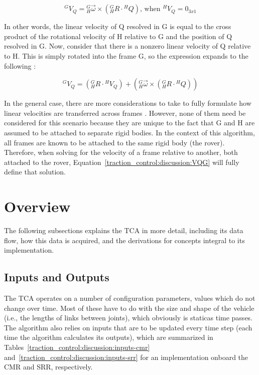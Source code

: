 \begin{equation}
	{}^{G}V_{Q} = {}^{G}_{H}\vec{\omega} \times \left({}^{G}_{H}R \cdot {}^{H}Q\right) \text{, when } {}^{H}V_{Q} = 0_{3x1}
\end{equation}

In other words, the linear velocity of Q resolved in G is equal to the cross product of the rotational velocity of H relative to G and the position of Q resolved in G. Now, consider that there is a nonzero linear velocity of Q relative to H. This is simply rotated into the frame G, so the expression expands to the following \cite{craig}:

\begin{equation}\label{traction_control:discussion:VQG}
	{}^{G}V_{Q} = \left({}^{G}_{H}R \cdot {}^{H}V_{Q}\right) + \left({}^{G}_{H}\vec{\omega} \times \left({}^{G}_{H}R \cdot {}^{H}Q\right)\right)
\end{equation}

In the general case, there are more considerations to take to fully formulate how linear velocities are transferred across frames \cite{craig}. However, none of them need be considered for this scenario because they are unique to the fact that G and H are assumed to be attached to separate rigid bodies. In the context of this algorithm, all frames are known to be attached to the same rigid body (the rover). Therefore, when solving for the velocity of a frame relative to another, both attached to the rover, Equation~\ref{traction_control:discussion:VQG} will fully define that solution.

\section{Overview}
The following subsections explains the \ac{TCA} in more detail, including its data flow, how this data is acquired, and the derivations for concepts integral to its implementation.

\subsection{Inputs and Outputs}
The \ac{TCA} operates on a number of configuration parameters, values which do not change over time. Most of these have to do with the size and shape of the vehicle (i.e., the lengths of links between joints), which obviously is staticas time passes. The algorithm also relies on inputs that are to be updated every time step (each time the algorithm calculates its outputs), which are summarized in Tables~\ref{traction_control:discussion:inputs-cmr} and~\ref{traction_control:discussion:inputs-srr} for an implementation onboard the \ac{CMR} and \ac{SRR}, respectively.

